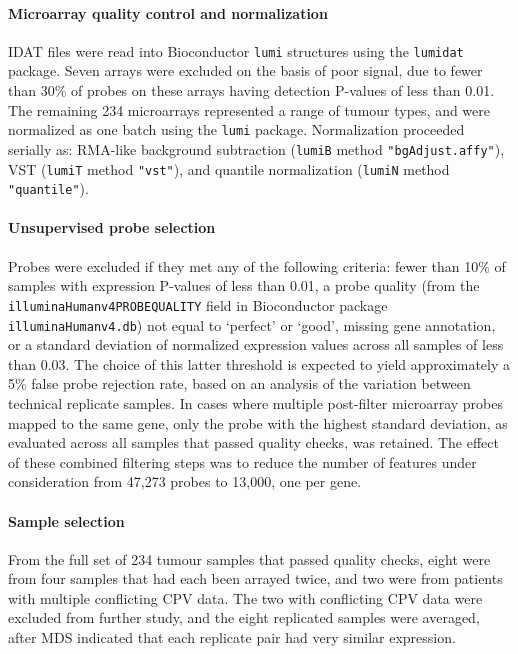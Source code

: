\documentclass[dissertation.tex]{subfiles}
\begin{document}
\paragraph{Microarray quality control and normalization}
\gls{IDAT} files were read into Bioconductor \texttt{lumi} structures using the \texttt{lumidat} package.  Seven arrays were excluded on the basis of poor signal, due to fewer than 30\% of probes on these arrays having detection P-values of less than 0.01.  The remaining 234 microarrays represented a range of tumour types, and were normalized as one batch using the \texttt{lumi} package.  Normalization proceeded serially as: RMA-like background subtraction (\texttt{lumiB} method \texttt{"bgAdjust.affy"}), \gls{VST} (\texttt{lumiT} method \texttt{"vst"}), and quantile normalization (\texttt{lumiN} method \texttt{"quantile"}).

\paragraph{Unsupervised probe selection}
Probes were excluded if they met any of the following criteria: fewer than 10\% of samples with expression P-values of less than 0.01, a probe quality (from the \texttt{illuminaHumanv4PROBEQUALITY} field in Bioconductor package \texttt{illuminaHumanv4.db}) not equal to `perfect' or `good', missing gene annotation, or a standard deviation of normalized expression values across all samples of less than 0.03.  The choice of this latter threshold is expected to yield approximately a 5\% false probe rejection rate, based on an analysis of the variation between technical replicate samples.  In cases where multiple post-filter microarray probes mapped to the same gene, only the probe with the highest standard deviation, as evaluated across all samples that passed quality checks, was retained.  The effect of these combined filtering steps was to reduce the number of features under consideration from 47,273 probes to 13,000, one per gene.

\paragraph{Sample selection}  From the full set of 234 tumour samples that passed quality checks, eight were from four samples that had each been arrayed twice, and two were from patients with multiple conflicting \gls{CPV} data.  The two with conflicting \gls{CPV} data were excluded from further study, and the eight replicated samples were averaged, after \gls{MDS} indicated that each replicate pair had very similar expression.
\end{document}
